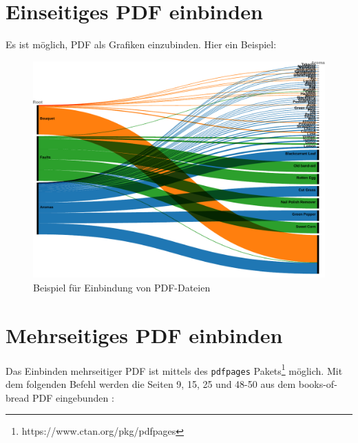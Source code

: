 \chapter{Einseitiges PDF einbinden}
Es ist möglich, PDF als Grafiken einzubinden. Hier ein Beispiel:
\begin{figure}[H]
    \centering
    \includegraphics[width=\textwidth]{content/00_assets/example.pdf}
    \caption{Beispiel für Einbindung von PDF-Dateien}
    \label{fig:enter-label}
\end{figure}

\chapter{Mehrseitiges PDF einbinden}
Das Einbinden mehrseitiger PDF ist mittels des \lstinline{pdfpages} Pakets\footnote{https://www.ctan.org/pkg/pdfpages} möglich. Mit dem folgenden Befehl werden die Seiten 9, 15, 25 und 48-50 aus dem books-of-bread PDF eingebunden \parencite{simmons_book_1903}: \\
\lstinline||

